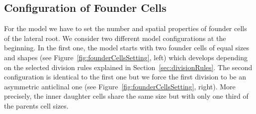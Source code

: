\documentclass[11pt,a4paper, final]{article}
\begin{document}
\subsection{Configuration of Founder Cells}
\label{sec:founderCells}
\noindent
For the model we have to set the number and spatial properties of founder cells of the lateral root.
We consider two different model configurations at the beginning. In the first one, the model starts with two founder cells of equal sizes and shapes (see Figure~\ref{fig:founderCellsSetting}, left) which develops depending on the selected division rules explained in Section~\ref{sec:divisionRules}. The second configuration is identical to the first one but we force the first division to be an asymmetric anticlinal one (see Figure~\ref{fig:founderCellsSetting}, right). More precisely, the inner daughter cells share the same size but with only one third of the parents cell sizes.
\end{document}
